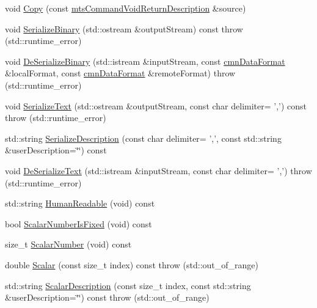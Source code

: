 \begin{DoxyCompactItemize}
\item 
void \hyperlink{classmts_command_void_return_description_aa8e1fda8aa28ae1b56b82132daf1e2d1}{Copy} (const \hyperlink{classmts_command_void_return_description}{mts\-Command\-Void\-Return\-Description} \&source)
\item 
void \hyperlink{classmts_command_void_return_description_a906b5f990278e13eb90c87aed7cb0b00}{Serialize\-Binary} (std\-::ostream \&output\-Stream) const   throw (std\-::runtime\-\_\-error)
\item 
void \hyperlink{classmts_command_void_return_description_a75600b5306b3cf1ee19659f5abc66f00}{De\-Serialize\-Binary} (std\-::istream \&input\-Stream, const \hyperlink{classcmn_data_format}{cmn\-Data\-Format} \&local\-Format, const \hyperlink{classcmn_data_format}{cmn\-Data\-Format} \&remote\-Format)  throw (std\-::runtime\-\_\-error)
\item 
void \hyperlink{classmts_command_void_return_description_a7390d3cca39ec23227cb3b6466489370}{Serialize\-Text} (std\-::ostream \&output\-Stream, const char delimiter= ',') const   throw (std\-::runtime\-\_\-error)
\item 
std\-::string \hyperlink{classmts_command_void_return_description_ab5806906f25a6ff7d6feab84fb9b00f4}{Serialize\-Description} (const char delimiter= ',', const std\-::string \&user\-Description=\char`\"{}\char`\"{}) const 
\item 
void \hyperlink{classmts_command_void_return_description_af144803a6870338eac1e82311059bfde}{De\-Serialize\-Text} (std\-::istream \&input\-Stream, const char delimiter= ',')  throw (std\-::runtime\-\_\-error)
\item 
std\-::string \hyperlink{classmts_command_void_return_description_a18ccff4dea37ce553ae4c4fded18fc38}{Human\-Readable} (void) const 
\item 
bool \hyperlink{classmts_command_void_return_description_a239f27438fe00b4a4b21685ec68ec369}{Scalar\-Number\-Is\-Fixed} (void) const 
\item 
size\-\_\-t \hyperlink{classmts_command_void_return_description_a258065b7c6d92785dad5f16554d08ad3}{Scalar\-Number} (void) const 
\item 
double \hyperlink{classmts_command_void_return_description_abf19d8315a62011ac28ba6af3f66b416}{Scalar} (const size\-\_\-t index) const   throw (std\-::out\-\_\-of\-\_\-range)
\item 
std\-::string \hyperlink{classmts_command_void_return_description_af048def6322ce042f0ed0a44781a50b1}{Scalar\-Description} (const size\-\_\-t index, const std\-::string \&user\-Description=\char`\"{}\char`\"{}) const   throw (std\-::out\-\_\-of\-\_\-range)
\end{DoxyCompactItemize}
